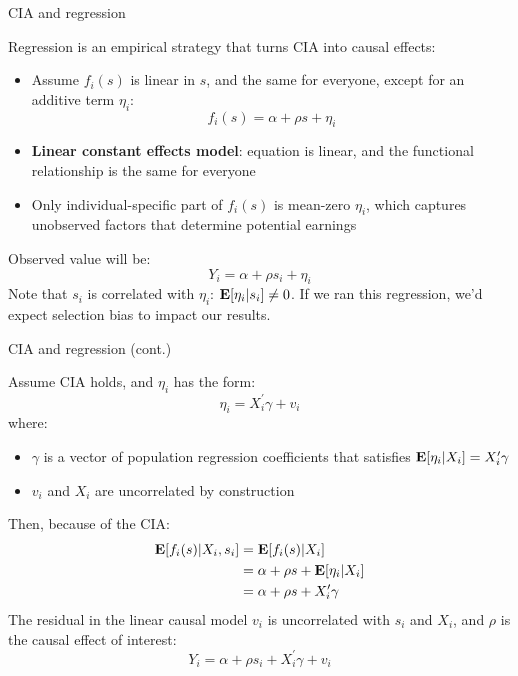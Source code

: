 \documentclass[compress, 8pt]{beamer}
\begin{document}
\begin{frame}{CIA and regression}

Regression is an empirical strategy that turns CIA into causal effects:
\begin{itemize}
    \item Assume $f_i(s)$ is linear in $s$, and the same for everyone, except for an additive term $\eta_i$:
    \begin{equation*}
        f_i(s) = \alpha + \rho s + \eta_i
    \end{equation*}
    \item \textbf{Linear constant effects model}: equation is linear, and the functional relationship is the same for everyone
    \item Only individual-specific part of $f_i(s)$ is mean-zero $\eta_i$, which captures unobserved factors that determine potential earnings
\end{itemize}
Observed value will be:
\begin{equation*}
    Y_i = \alpha + \rho s_i + \eta_i
\end{equation*}
Note that $s_i$ is correlated with $\eta_i$: $\mathbf{E} [\eta_i \vert s_i] \neq 0$. If we ran this regression, we'd expect selection bias to impact our results.

\end{frame}

\begin{frame}{CIA and regression (cont.)}

Assume CIA holds, and $\eta_i$ has the form:
\begin{equation*}
    \eta_i = X_i^\prime \gamma + v_i
\end{equation*}
where: 
\begin{itemize}
    \item $\gamma$ is a vector of population regression coefficients that satisfies $\mathbf{E} [\eta_i \vert X_i] = X_i^\prime \gamma$
    \item $v_i$ and $X_i$ are uncorrelated by construction
\end{itemize}
Then, because of the CIA:
\begin{align*}
    \mathbf{E} [f_i(s) \vert X_i, s_i] &= \mathbf{E}[f_i (s) \vert X_i] \\
    &= \alpha + \rho s + \mathbf{E} [\eta_i \vert X_i] \\
    &= \alpha + \rho s + X_i^\prime \gamma
\end{align*}
The residual in the linear causal model $v_i$ is uncorrelated with $s_i$ and $X_i$, and $\rho$ is the causal effect of interest:
\begin{equation*}
    Y_i = \alpha + \rho s_i + X_i^\prime \gamma + v_i
\end{equation*}

\end{frame}
\end{document}
